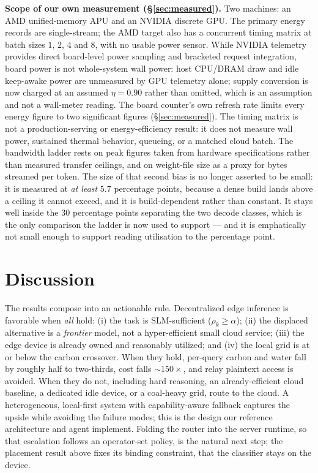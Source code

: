 \documentclass[conference]{IEEEtran}
\begin{document}
\textbf{Scope of our own measurement (\S\ref{sec:measured}).} Two machines: an
AMD unified-memory APU and an NVIDIA discrete GPU. The primary energy records
are single-stream; the AMD target also has a concurrent timing matrix at batch
sizes $1$, $2$, $4$ and $8$, with no usable power sensor. While NVIDIA telemetry
provides direct board-level power sampling and bracketed request integration,
board power is not whole-system wall power: host
CPU/DRAM draw and idle keep-awake power are unmeasured by GPU telemetry alone;
supply conversion is now charged at an assumed $\eta=0.90$ rather than omitted,
which is an assumption and not a wall-meter reading. The board counter's own
refresh rate limits every energy figure to two significant figures
(\S\ref{sec:measured}). The timing matrix is not a production-serving or
energy-efficiency result: it does not measure wall power, sustained thermal
behavior, queueing, or a matched cloud batch. The bandwidth ladder rests on
peak figures taken from hardware specifications rather than measured transfer
ceilings, and
on weight-file size as a proxy for bytes streamed per token. The size of that
second bias is no longer asserted to be small: it is measured at \emph{at
least} $5.7$ percentage points, because a dense build lands above a ceiling it
cannot exceed, and it is build-dependent rather than constant. It stays well
inside the $30$ percentage points separating the two decode classes, which is
the only comparison the ladder is now used to support --- and it is
emphatically not small enough to support reading utilisation to the
percentage point.
\section{Discussion}
The results compose into an actionable rule. Decentralized edge inference is
favorable when \emph{all} hold: (i) the task is SLM-sufficient
($\rho_k\ge\alpha$); (ii) the displaced alternative is a \emph{frontier} model,
not a hyper-efficient small cloud service; (iii) the edge device is already owned
and reasonably utilized; and (iv) the local grid is at or below the carbon
crossover. When they hold, per-query carbon and water fall by roughly half to
two-thirds, cost falls $\sim$$150\times$, and relay plaintext access is avoided.
When they do
not, including hard reasoning, an already-efficient cloud baseline, a dedicated
idle device, or a coal-heavy grid, route to the cloud. A heterogeneous, local-first
system with capability-aware fallback \cite{belcak2025} captures the upside while
avoiding the failure modes; this is the design our reference architecture and
agent implement. Folding the router into the server runtime, so that
escalation follows an operator-set policy, is the natural next step; the
placement result above fixes its binding constraint, that the classifier stays
on the device.
\end{document}
